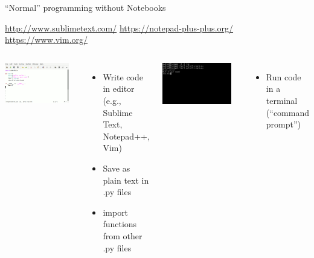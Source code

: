 \documentclass[aspectratio=169,usenames,dvipsnames]{beamer}
\begin{document}
\begin{frame}{``Normal'' programming without Notebooks}
    \begin{reference}
        \url{http://www.sublimetext.com/}
        \url{https://notepad-plus-plus.org/}
        \url{https://www.vim.org/}
    \end{reference}
    \begin{columns}[T]
            \includegraphics[width=0.9\textwidth]{fig/editor}
            \begin{itemize}
                \item Write code in editor (e.g., Sublime Text, Notepad++, Vim)
                \item Save as plain text in .py files
                \item import functions \\
                    from other .py files
            \end{itemize}
        \pause
            \includegraphics[width=0.9\textwidth]{fig/terminal}
            \begin{itemize}
                \item Run code in a terminal\\
                    (``command prompt'')
            \end{itemize}
    \end{columns}
\end{frame}
\end{document}
